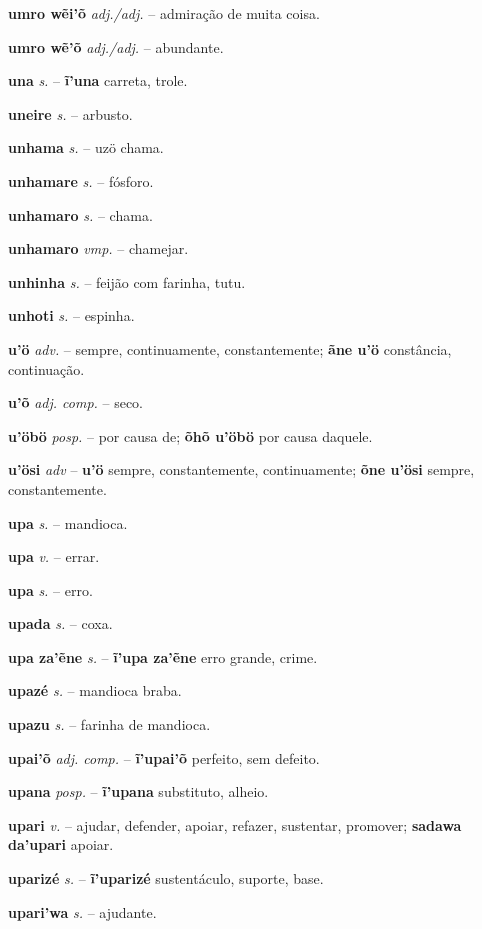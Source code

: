 \textbf{umro wẽi'õ} \textit{adj./adj.} -- admiração de muita coisa.

\textbf{umro wẽ'õ} \textit{adj./adj.} -- abundante.

\textbf{una} \textit{s.} -- \textbf{ĩ'una} carreta, trole.

\textbf{uneire} \textit{s.} -- arbusto.

\textbf{unhama} \textit{s.} -- uzö chama.

\textbf{unhamare} \textit{s.} -- fósforo.

\textbf{unhamaro} \textit{s.} -- chama.

\textbf{unhamaro} \textit{vmp.} -- chamejar.

\textbf{unhinha} \textit{s.} -- feijão com farinha, tutu.

\textbf{unhoti} \textit{s.} -- espinha.

\textbf{u'ö} \textit{adv.} -- sempre, continuamente, constantemente; \textbf{ãne u'ö} constância, continuação.

\textbf{u'õ} \textit{adj. comp.} -- seco.

\textbf{u'öbö} \textit{posp.} -- por causa de; \textbf{õhõ u'öbö} por causa daquele.

\textbf{u'ösi} \textit{adv} -- \textbf{u'ö} sempre, constantemente, continuamente; \textbf{õne u'ösi} sempre, constantemente.

\textbf{upa} \textit{s.} -- mandioca.

\textbf{upa} \textit{v.} -- errar.

\textbf{upa} \textit{s.} -- erro.

\textbf{upada} \textit{s.} -- coxa.

\textbf{upa za'ẽne} \textit{s.} -- \textbf{ĩ'upa za'ẽne} erro grande, crime.

\textbf{upazé} \textit{s.} -- mandioca braba.

\textbf{upazu} \textit{s.} -- farinha de mandioca.

\textbf{upai'õ} \textit{adj. comp.} -- \textbf{ĩ'upai'õ} perfeito, sem defeito.

\textbf{upana} \textit{posp.} -- \textbf{ĩ'upana} substituto, alheio.

\textbf{upari} \textit{v.} -- ajudar, defender, apoiar, refazer, sustentar, promover; \textbf{sadawa da'upari} apoiar.

\textbf{uparizé} \textit{s.} -- \textbf{ĩ'uparizé} sustentáculo, suporte, base.

\textbf{upari'wa} \textit{s.} -- ajudante.

